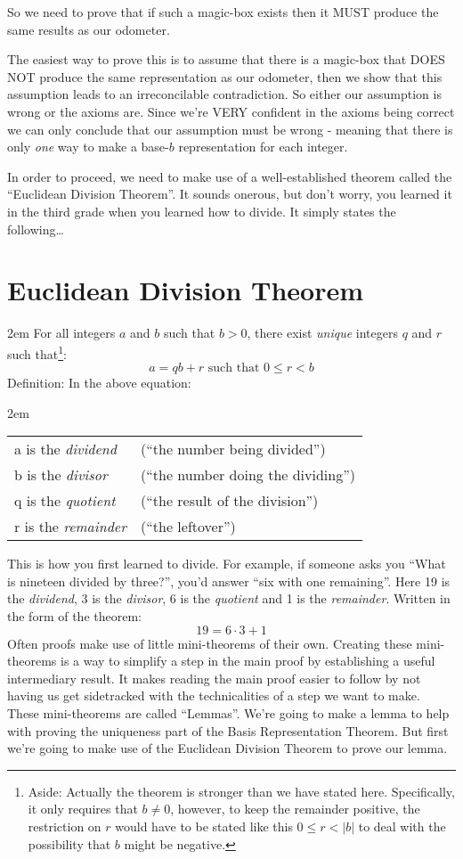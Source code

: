 \documentclass{article}
\newenvironment{jprIn}{\begin{adjustwidth}{2em}{}}{\end{adjustwidth}}
\begin{document}
So we need to prove that if such a magic-box exists then it MUST
produce the same results as our odometer.

The easiest way to prove this is to assume that there is a magic-box
that DOES NOT produce the same representation as our odometer, then we show that
this assumption leads to an irreconcilable contradiction.
So either our assumption is wrong or the axioms are.
Since we're VERY confident in the axioms being correct we can only 
conclude that our assumption must be wrong - meaning
that there is only \emph{one} way 
to make a base-$b$ representation for each integer.

In order to proceed, we
need to make use of a well-established theorem
called the ``Euclidean Division Theorem''.
It sounds onerous, but don't worry, you learned it
in the third grade when you learned how to divide.
It simply states the following\dots{}

\break
\section*{Euclidean Division Theorem}
\begin{jprIn}
For all integers $a$ and $b$ such that $b>0$,
there exist \emph{unique} integers $q$ and $r$ such that\footnote{Aside:
Actually the theorem is stronger than we have stated here.
Specifically, it only requires that $b\ne0$, however,
to keep the remainder positive, the restriction on $r$
would have to be stated like
this $0\le{}r<\left|b\right|$ to deal with
the possibility that $b$ might be negative.}:
\[a=qb+r  \text{ such that } 0\le{}r<b\]
Definition: In the above equation:
\begin{jprIn}
\begin{tabular}{l l}
a is the \emph{dividend} & (``the number being divided'')\\
b is the \emph{divisor} & (``the number doing the dividing'')\\
q is the \emph{quotient} & (``the result of the division'')\\
r is the \emph{remainder} & (``the leftover'')
\end{tabular}
\end{jprIn}
\end{jprIn}
This is how you first learned to divide.
For example, if someone asks you ``What is nineteen divided by three?'', you'd
answer ``six with one remaining''. Here 19 is the \emph{dividend},  3 is the \emph{divisor},
6 is the \emph{quotient} and 1 is the \emph{remainder}. Written in the form of the theorem:
\[19=6\cdot3+1\]
Often proofs make use of little mini-theorems of their own.
Creating these mini-theorems is a way to simplify a step in
the main proof by establishing a useful
intermediary result. It makes reading the main proof
easier to follow by not having us get sidetracked with
the technicalities of a step we want to make.
These mini-theorems are called ``Lemmas''.
We're going to make a lemma to help with proving the uniqueness part
of the Basis Representation Theorem. But first we're going to make use of the
Euclidean Division Theorem to prove our lemma.
\end{document}
